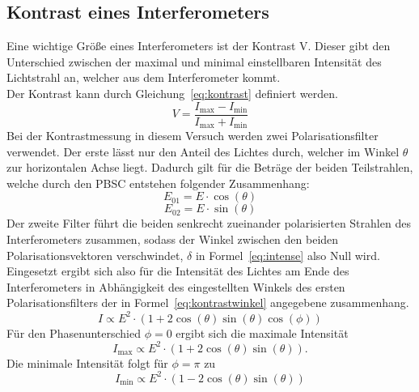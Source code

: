 \subsection{Kontrast eines Interferometers}
%
Eine wichtige Größe eines Interferometers ist der Kontrast V. Dieser 
gibt den Unterschied zwischen der maximal und minimal 
einstellbaren Intensität des Lichtstrahl an, welcher aus 
dem Interferometer kommt.\\
Der Kontrast kann durch Gleichung~\eqref{eq:kontrast} 
definiert werden.
\begin{equation}
V = \frac{I_\text{max}-I_\text{min}}{I_\text{max}+I_\text{min}}
\label{eq:kontrast}
\end{equation}
Bei der Kontrastmessung in diesem Versuch werden zwei 
Polarisationsfilter verwendet. Der erste lässt nur den Anteil 
des Lichtes durch, welcher im Winkel $\theta$ zur 
horizontalen Achse liegt. 
Dadurch gilt für die Beträge der beiden Teilstrahlen, welche durch 
den PBSC entstehen folgender Zusammenhang:
\begin{equation*}
E_{01}=E\cdot\cos{(\theta)}
\end{equation*}
\begin{equation*}
E_{02}=E\cdot\sin{(\theta)}
\end{equation*}
Der zweite Filter führt die beiden senkrecht zueinander 
polarisierten Strahlen des 
Interferometers zusammen, sodass der Winkel zwischen den 
beiden Polarisationsvektoren verschwindet, $\delta$ in 
Formel~\eqref{eq:intense} also Null wird.\\
Eingesetzt ergibt sich also für die Intensität des Lichtes 
am Ende des Interferometers in Abhängigkeit des 
eingestellten Winkels des ersten Polarisationsfilters der in 
Formel~\eqref{eq:kontrastwinkel} angegebene zusammenhang.
\begin{equation}
I \propto E^2\cdot(1 + 2\cos{(\theta)}\sin{(\theta)}\cos{(\phi)})
\label{eq:kontrastwinkel}
\end{equation}
Für den Phasenunterschied $\phi = 0$ ergibt sich die maximale 
Intensität
\begin{equation}
  I_\text{max} \propto E^2\cdot(1 + 2\cos{(\theta)}\sin{(\theta)}).
  \label{eq:intens_max}
\end{equation}
Die minimale Intensität folgt für $\phi = \pi$ zu
\begin{equation}
  I_\text{min} \propto E^2\cdot(1 - 2\cos{(\theta)}\sin{(\theta)})
  \label{eq:intens_min}
\end{equation}
%
